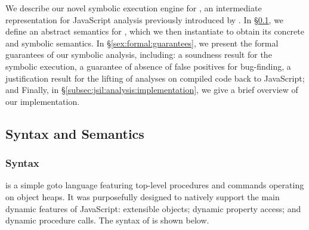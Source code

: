 

We describe our novel symbolic execution engine for \jsil, an intermediate
representation for JavaScript analysis previously introduced by \citet{javert}. 
In \S\ref{subsec:jsil:analysis:formalism}, we define an abstract semantics for 
\jsil, which we then instantiate to obtain its concrete and symbolic semantics.
In \S\ref{sex:formal:guarantees}, we present the formal guarantees of 
our symbolic analysis, including:  a soundness result for the \jsil symbolic 
execution,  a guarantee of absence of false positives for bug-finding, 
 a justification result for the lifting of analyses on compiled \jsil code back to JavaScript;
and  
Finally, in \S\ref{subsec:jsil:analysis:implementation}, we give a brief overview
of our implementation. %


\subsection{Syntax and Semantics}\label{subsec:jsil:analysis:formalism}

\subsubsection{Syntax} 
\jsil is a simple goto language featuring top-level procedures and commands operating on object heaps. It was purposefully designed to natively support the main dynamic features of JavaScript: extensible objects; dynamic property access; and dynamic procedure calls. The syntax of \jsil is shown below. 


